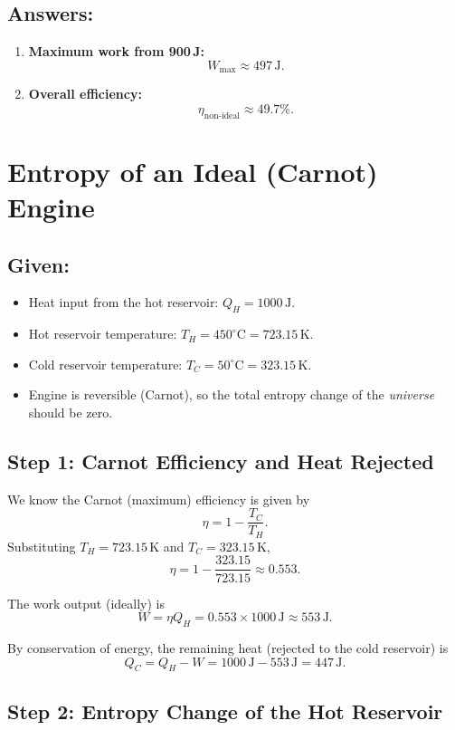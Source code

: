 \documentclass[12pt]{article}
\theoremstyle{definition} %
\theoremstyle{plain} %
\begin{document}
\subsection*{Answers:}
\begin{enumerate}
\item \textbf{Maximum work from 900\,J:} 
\[
W_\mathrm{max} \approx 497\,\mathrm{J}.
\]
\item \textbf{Overall efficiency:}
\[
\eta_{\mathrm{non\text{-}ideal}} \approx 49.7\%.
\]
\end{enumerate}


\section*{Entropy of an Ideal (Carnot) Engine}

\subsection*{Given:}
\begin{itemize}
    \item Heat input from the hot reservoir: \( Q_H = 1000 \,\mathrm{J} \).
    \item Hot reservoir temperature: \( T_H = 450^\circ \mathrm{C} = 723.15\,\mathrm{K}.\)
    \item Cold reservoir temperature: \( T_C = 50^\circ \mathrm{C}  = 323.15\,\mathrm{K}.\)
    \item Engine is reversible (Carnot), so the total entropy change of the \emph{universe} should be zero.
\end{itemize}

\subsection*{Step 1: Carnot Efficiency and Heat Rejected}

We know the Carnot (maximum) efficiency is given by
\[
\eta = 1 - \frac{T_C}{T_H}.
\]
Substituting \(T_H = 723.15\,\mathrm{K}\) and \(T_C = 323.15\,\mathrm{K}\),
\[
\eta = 1 - \frac{323.15}{723.15} \approx 0.553.
\]

The work output (ideally) is
\[
W = \eta Q_H = 0.553 \times 1000\,\mathrm{J} \approx 553\,\mathrm{J}.
\]

By conservation of energy, the remaining heat (rejected to the cold reservoir) is
\[
Q_C = Q_H - W = 1000\,\mathrm{J} - 553\,\mathrm{J} = 447\,\mathrm{J}.
\]

\subsection*{Step 2: Entropy Change of the Hot Reservoir}
\end{document}
